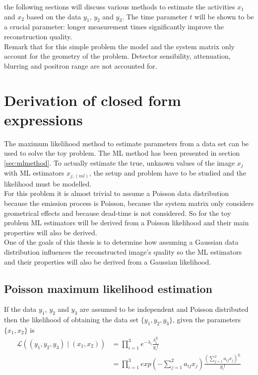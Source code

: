\documentclass[report,12pt]{report}
\begin{document}
the following sections will discuss various methods to estimate the activities $x_1$ and $x_2$ based on the data $y_1$, $y_2$ and $y_3$. The time parameter $t$ will be shown to be a crucial parameter: longer measurement times significantly improve the reconstruction quality.\\

Remark that for this simple problem the model and the system matrix only account for the geometry of the problem. Detector sensibility, attenuation, blurring and positron range are not accounted for.




\section{Derivation of closed form expressions}
The maximum likelihood method to estimate parameters from a data set can be used to solve the toy problem. The ML method has been presented in section \ref{sec:mlmethod}. To actually estimate the true, unknown values of the image $x_j$ with ML estimators $\hat x_{j, (ml)}$, the setup and problem have to be studied and the likelihood must be modelled.\\

For this problem it is almost trivial to assume a Poisson data distribution because the emission process is Poisson, because the system matrix only considers geometrical effects and because dead-time is not considered. So for the toy problem ML estimators will be derived from a Poisson likelihood and their main properties will also be derived.\\

One of the goals of this thesis is to determine how assuming a Gaussian data distribution influences the reconstructed image's quality so the ML estimators and their properties will also be derived from a Gaussian likelihood.\\




\subsection{Poisson maximum likelihood estimation}\label{sec:ML}
If the data $y_1$, $y_2$ and $y_3$ are assumed to be independent and Poisson distributed then the likelihood of obtaining the data set $\{y_1, y_2, y_3\}$, given the parameters $\{x_1, x_2\}$ is
\begin{align}
	\mathcal{L} \left( (y_1, y_2, y_3) \mid (x_1, x_2) \right) 
	&= 
	\prod_{i=1}^{3} e^{-\lambda_i} \frac{\lambda_i^{y_i}}{y_i!}
	\nonumber\\
	&= \prod_{i=1}^{3} exp\left(-\sum_{j=1}^{2}a_{ij}x_j\right)
	\frac{(\sum_{j=1}^{2}a_{ij}x_j)^{y_i}}{y_i!}
	\label{eq:likelihoodtoy}
\end{align}
\end{document}
